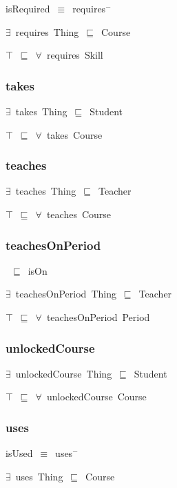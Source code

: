 \documentclass{article}
\begin{document}
isRequired~\ensuremath{\equiv}~requires\ensuremath{^-}

\ensuremath{\exists}~requires~Thing~\ensuremath{\sqsubseteq}~Course

\ensuremath{\top}~\ensuremath{\sqsubseteq}~\ensuremath{\forall}~requires~Skill

\subsubsection*{takes}

\ensuremath{\exists}~takes~Thing~\ensuremath{\sqsubseteq}~Student

\ensuremath{\top}~\ensuremath{\sqsubseteq}~\ensuremath{\forall}~takes~Course

\subsubsection*{teaches}

\ensuremath{\exists}~teaches~Thing~\ensuremath{\sqsubseteq}~Teacher

\ensuremath{\top}~\ensuremath{\sqsubseteq}~\ensuremath{\forall}~teaches~Course

\subsubsection*{teachesOnPeriod}

~\ensuremath{\sqsubseteq}~isOn

\ensuremath{\exists}~teachesOnPeriod~Thing~\ensuremath{\sqsubseteq}~Teacher

\ensuremath{\top}~\ensuremath{\sqsubseteq}~\ensuremath{\forall}~teachesOnPeriod~Period

\subsubsection*{unlockedCourse}

\ensuremath{\exists}~unlockedCourse~Thing~\ensuremath{\sqsubseteq}~Student

\ensuremath{\top}~\ensuremath{\sqsubseteq}~\ensuremath{\forall}~unlockedCourse~Course

\subsubsection*{uses}

isUsed~\ensuremath{\equiv}~uses\ensuremath{^-}

\ensuremath{\exists}~uses~Thing~\ensuremath{\sqsubseteq}~Course
\end{document}
